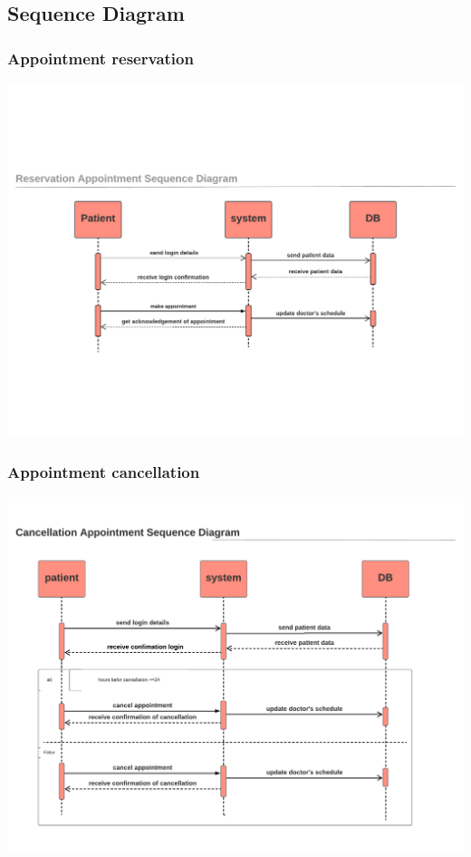 \documentclass[../Psychological_system_web_application.tex]{subfiles}
\begin{document}
					
					
						
					\subsection{Sequence Diagram}
						\subsubsection{Appointment reservation}
							
								\includegraphics[width=\textwidth ,height=0.4\textheight ,scale=4]{Diagrams/sequence_diagram/appointment_reservation.pdf}
								\label{FIG:2.07}
							
							
						
						\subsubsection{Appointment cancellation}
							
								\includegraphics[width=\textwidth ,height=0.4\textheight ,scale=4]{Diagrams/sequence_diagram/appointment_cancellation.pdf}
								\label{FIG:2.08}
							
\end{document}
